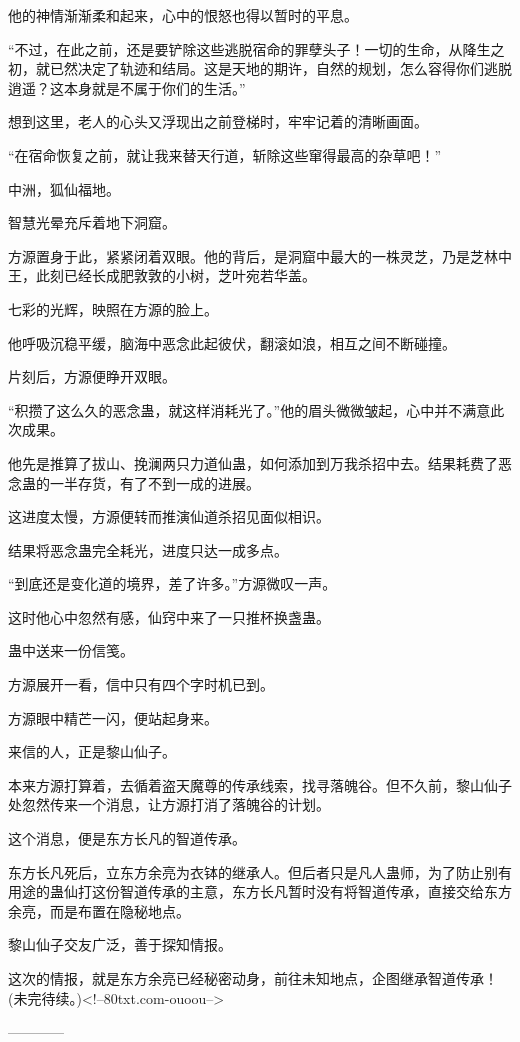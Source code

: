 \begin{this_body}
他的神情渐渐柔和起来，心中的恨怒也得以暂时的平息。

“不过，在此之前，还是要铲除这些逃脱宿命的罪孽头子！一切的生命，从降生之初，就已然决定了轨迹和结局。这是天地的期许，自然的规划，怎么容得你们逃脱逍遥？这本身就是不属于你们的生活。”

想到这里，老人的心头又浮现出之前登梯时，牢牢记着的清晰画面。

“在宿命恢复之前，就让我来替天行道，斩除这些窜得最高的杂草吧！”

中洲，狐仙福地。

智慧光晕充斥着地下洞窟。

方源置身于此，紧紧闭着双眼。他的背后，是洞窟中最大的一株灵芝，乃是芝林中王，此刻已经长成肥敦敦的小树，芝叶宛若华盖。

七彩的光辉，映照在方源的脸上。

他呼吸沉稳平缓，脑海中恶念此起彼伏，翻滚如浪，相互之间不断碰撞。

片刻后，方源便睁开双眼。

“积攒了这么久的恶念蛊，就这样消耗光了。”他的眉头微微皱起，心中并不满意此次成果。

他先是推算了拔山、挽澜两只力道仙蛊，如何添加到万我杀招中去。结果耗费了恶念蛊的一半存货，有了不到一成的进展。

这进度太慢，方源便转而推演仙道杀招见面似相识。

结果将恶念蛊完全耗光，进度只达一成多点。

“到底还是变化道的境界，差了许多。”方源微叹一声。

这时他心中忽然有感，仙窍中来了一只推杯换盏蛊。

蛊中送来一份信笺。

方源展开一看，信中只有四个字时机已到。

方源眼中精芒一闪，便站起身来。

来信的人，正是黎山仙子。

本来方源打算着，去循着盗天魔尊的传承线索，找寻落魄谷。但不久前，黎山仙子处忽然传来一个消息，让方源打消了落魄谷的计划。

这个消息，便是东方长凡的智道传承。

东方长凡死后，立东方余亮为衣钵的继承人。但后者只是凡人蛊师，为了防止别有用途的蛊仙打这份智道传承的主意，东方长凡暂时没有将智道传承，直接交给东方余亮，而是布置在隐秘地点。

黎山仙子交友广泛，善于探知情报。

这次的情报，就是东方余亮已经秘密动身，前往未知地点，企图继承智道传承！(未完待续。)<!--80txt.com-ouoou-->

------------

\end{this_body}

